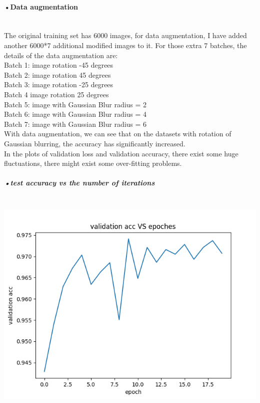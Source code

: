 \documentclass[11pt]{article} %
\begin{document}
\paragraph{•Data augmentation}\mbox{}\\
The original training set has 6000 images, for data augmentation, I have added another 6000*7 additional modified images to it. For those extra 7 batches, the details of the data augmentation are:\\
Batch 1: image rotation -45 degrees\\
Batch 2: image rotation 45 degrees\\
Batch 3: image rotation -25 degrees\\
Batch 4 image rotation 25 degrees\\
Batch 5: image with Gaussian Blur radius = 2\\
Batch 6: image with Gaussian Blur radius = 4\\
Batch 7: image with Gaussian Blur radius = 6\\
With data augmentation, we can see that on the datasets with rotation of Gaussian blurring, the accuracy has significantly increased.\\
In the plots of validation loss and validation accuracy, there exist some huge fluctuations, there might exist some over-fitting problems.
\subparagraph{•test accuracy vs the number of iterations}\mbox{}\\
\includegraphics[scale=0.7]{e142val_acc.png}
\end{document}
